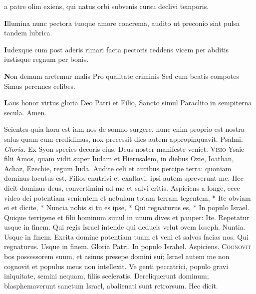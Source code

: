 \begin{multicols*}{2}
{a patre olim exiens,
qui natus orbi subvenis
cursu declivi temporis.
\par {\bfseries \color{Red} I}llumina nunc pectora
tuoque amore concrema,
audito ut preconio
sint pulsa tandem lubrica.
\par {\bfseries \color{Blue} I}udexque cum post aderis
rimari facta pectoris
reddens vicem per abditis
iustisque regnum per bonis.
\par {\bfseries \color{Red} N}on demum arctemur malis
Pro qualitate criminis
Sed cum beatis compotes
Simus perennes celibes.
\par {\bfseries \color{Blue} L}aus honor virtus gloria
Deo Patri et Filio,
Sancto simul Paraclito
in sempiterna secula. Amen.
}
 Scientes quia hora est iam nos de somno surgere, nunc enim proprio est nostra salus quam cum credidimus, nox precessit dies autem appropinquavit. {\color{Red} Psalmi.}
\textit{Gloria.} \V Ex Syon species decoris eius. \R Deus noster manifeste veniet.
\lettrine[lines=2]{\zallmancaps \color{Blue} V}{isio} Ysaie filii Amos, quam vidit super Iudam et Hierusalem, in diebus Ozie, Ioathan, Achaz, Ezechie, regum Iuda. Audite celi et auribus percipe terra: quoniam dominus locutus est. Filios enutrivi et exaltavi: ipsi autem spreverunt me. Hec dicit dominus deus, convertimini ad me et salvi eritis.
\hypertarget{aspiciens}{\label{aspiciens}}
\R Aspiciens a longe, ecce video dei potentiam venientem et nebulam totam terram tegentem, * Ite obviam ei et dicite, * Nuncia nobis si tu es ipse, * Qui regnaturus es, * In populo Israel. \V Quique terrigene et filii hominum simul in unum dives et pauper: Ite. Repetatur usque in finem. \V Qui regis Israel intende qui deducis velut ovem Ioseph. Nuntia. Usque in finem. \V Excita domine potentiam tuam et veni et salvos facias nos. Qui regnaturus. Usque in finem. Gloria Patri. In populo Israhel. \R Aspiciens.
\lettrine[lines=2]{\zallmancaps \color{Red} C}{ognovit} bos possessorem suum, et asinus presepe domini sui; Israel autem me non cognovit et populus meus non intellexit. Ve genti peccatrici, populo gravi iniquitate, semini nequam, filiis sceleratis. Dereliquerunt dominum; blasphemaverunt sanctum Israel, abalienati sunt retrorsum. Hec dicit.

\end{multicols*}
